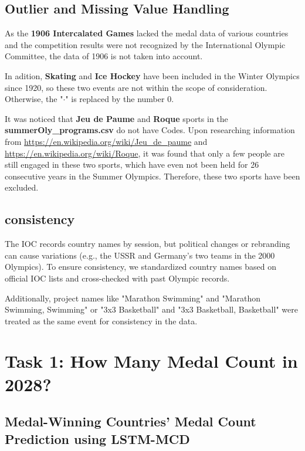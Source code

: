 \documentclass{mcmthesis}
\begin{document}
\subsection{Outlier and Missing Value Handling}
As the \textbf{1906 Intercalated Games} lacked the medal data of various countries and the competition results were not recognized by the International Olympic Committee, the data of 1906 is not taken into account.

In adition, \textbf{Skating} and \textbf{Ice Hockey} have been included in the Winter Olympics since 1920, so these two events are not within the scope of consideration. Otherwise, the "$\cdot$" is replaced by the number $0$. 

It was noticed that \textbf{Jeu de Paume} and \textbf{Roque} sports in the {\bf summerOly\_programs.csv} do not have Codes. Upon researching information from {\color{blue}\url{https://en.wikipedia.org/wiki/Jeu_de_paume}} and {\color{blue}\url{https://en.wikipedia.org/wiki/Roque}}, it was found that only a few people are still engaged in these two sports, which have even not been held for 26 consecutive years in the Summer Olympics. Therefore, these two sports have been excluded.

\subsection{consistency}
The IOC records country names by session, but political changes or rebranding can cause variations (e.g., the USSR and Germany's two teams in the 2000 Olympics). To ensure consistency, we standardized country names based on official IOC lists and cross-checked with past Olympic records. 

Additionally, project names like "Marathon Swimming" and "Marathon Swimming, Swimming" or "3x3 Basketball" and "3x3 Basketball, Basketball" were treated as the same event for consistency in the data.
%
%
%
%	
%	
%	
%	
%	
%	
%	
%	
%	
%	
%	
%	
%	
%	
	\newpage
	\section{Task 1: How Many Medal Count in 2028? }
	\subsection{Medal-Winning Countries' Medal Count Prediction using LSTM-MCD}
	
\end{document}
